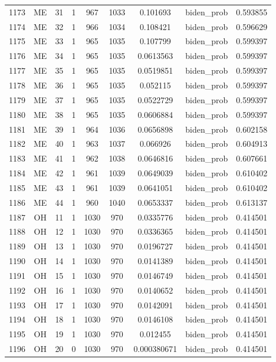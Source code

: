 \documentclass[12pt,a4paper]{article}
\begin{document}
\begin{tabular}{r|cccccccc}
	1173 & ME & 31 & 1 & 967 & 1033 & 0.101693 & biden\_prob & 0.593855 \\
	1174 & ME & 32 & 1 & 966 & 1034 & 0.108421 & biden\_prob & 0.596629 \\
	1175 & ME & 33 & 1 & 965 & 1035 & 0.107799 & biden\_prob & 0.599397 \\
	1176 & ME & 34 & 1 & 965 & 1035 & 0.0613563 & biden\_prob & 0.599397 \\
	1177 & ME & 35 & 1 & 965 & 1035 & 0.0519851 & biden\_prob & 0.599397 \\
	1178 & ME & 36 & 1 & 965 & 1035 & 0.052115 & biden\_prob & 0.599397 \\
	1179 & ME & 37 & 1 & 965 & 1035 & 0.0522729 & biden\_prob & 0.599397 \\
	1180 & ME & 38 & 1 & 965 & 1035 & 0.0606884 & biden\_prob & 0.599397 \\
	1181 & ME & 39 & 1 & 964 & 1036 & 0.0656898 & biden\_prob & 0.602158 \\
	1182 & ME & 40 & 1 & 963 & 1037 & 0.066926 & biden\_prob & 0.604913 \\
	1183 & ME & 41 & 1 & 962 & 1038 & 0.0646816 & biden\_prob & 0.607661 \\
	1184 & ME & 42 & 1 & 961 & 1039 & 0.0649039 & biden\_prob & 0.610402 \\
	1185 & ME & 43 & 1 & 961 & 1039 & 0.0641051 & biden\_prob & 0.610402 \\
	1186 & ME & 44 & 1 & 960 & 1040 & 0.0653337 & biden\_prob & 0.613137 \\
	1187 & OH & 11 & 1 & 1030 & 970 & 0.0335776 & biden\_prob & 0.414501 \\
	1188 & OH & 12 & 1 & 1030 & 970 & 0.0336365 & biden\_prob & 0.414501 \\
	1189 & OH & 13 & 1 & 1030 & 970 & 0.0196727 & biden\_prob & 0.414501 \\
	1190 & OH & 14 & 1 & 1030 & 970 & 0.0141389 & biden\_prob & 0.414501 \\
	1191 & OH & 15 & 1 & 1030 & 970 & 0.0146749 & biden\_prob & 0.414501 \\
	1192 & OH & 16 & 1 & 1030 & 970 & 0.0140652 & biden\_prob & 0.414501 \\
	1193 & OH & 17 & 1 & 1030 & 970 & 0.0142091 & biden\_prob & 0.414501 \\
	1194 & OH & 18 & 1 & 1030 & 970 & 0.0146108 & biden\_prob & 0.414501 \\
	1195 & OH & 19 & 1 & 1030 & 970 & 0.012455 & biden\_prob & 0.414501 \\
	1196 & OH & 20 & 0 & 1030 & 970 & 0.000380671 & biden\_prob & 0.414501 \\

\end{tabular}
\end{document}
